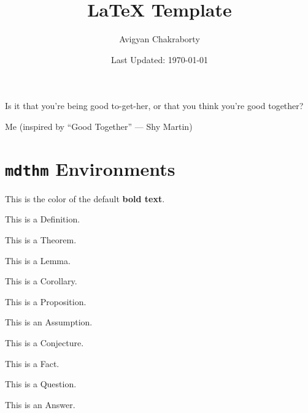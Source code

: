 \documentclass[12pt]{scrartcl}
\title{LaTeX Template}
\author{Avigyan Chakraborty}
\date{Last Updated: \today}
\begin{document}
\maketitle

\epigraph{Is it that you're being good to-get-her, or that you think you're good together?}{Me (inspired by “Good Together” --- Shy Martin)}

\tableofcontents

\newpage


\section{\texttt{mdthm} Environments}


This is the color of the default \textbf{bold text}.

\begin{definition}
[Name]
This is a Definition.
\end{definition}

\begin{theorem}
[Name]
This is a Theorem.
\end{theorem}

\begin{lemma}
[Name]
This is a Lemma.
\end{lemma}

\begin{corollary}
[Name]
This is a Corollary.
\end{corollary}

\begin{proposition}
[Name]
This is a Proposition.
\end{proposition}

\begin{assume}
[Name]
This is an Assumption.
\end{assume}

\begin{conjecture}
[Name]
This is a Conjecture.
\end{conjecture}

\begin{fact}
[Name]
This is a Fact.
\end{fact}

\begin{ques}
[Name]
This is a Question.
\end{ques}

\begin{answer}
[Name]
This is an Answer.
\end{answer}
\end{document}
